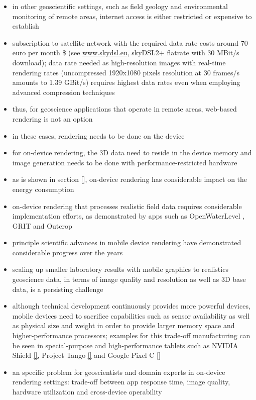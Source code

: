 \documentclass[review]{elsarticle}
\begin{document}
\begin{itemize}
\item in other geoscientific settings, such as field geology \cite{} and environmental monitoring \cite{} of remote areas, internet access is either restricted or expensive to establish
\item subscription to satellite network with the required data rate costs around 70 euro per month \$ (see \url{www.skydsl.eu}, skyDSL2+ flatrate with 30 MBit/s download); data rate needed as high-resolution images with real-time rendering rates (uncompressed 1920x1080 pixels resolution at 30 frames/s amounts to 1.39 GBit/s) requires highest data rates even when employing advanced compression techniques
\item thus, for geoscience applications that operate in remote areas, web-based rendering is not an option
\item in these cases, rendering needs to be done on the device
\item for on-device rendering, the 3D data need to reside in the device memory and image generation needs to be done with performance-restricted hardware
\item as is shown in section \ref{}, on-device rendering has considerable impact on the energy consumption
\item on-device rendering that processes realistic field data requires considerable implementation efforts, as demonstrated by apps such as OpenWaterLevel \cite{}, GRIT \cite{} and Outcrop \cite{}
\item principle scientific advances in mobile device rendering have demonstrated considerable progress over the years \cite{Garcia2015,Kehl2015a,Agus2017}
\item scaling up smaller laboratory results with mobile graphics to realistics geoscience data, in terms of image quality and resolution as well as 3D base data, is a persisting challenge
\item although technical development continuously provides more powerful devices, mobile devices need to sacrifice capabilities such as sensor availability as well as physical size and weight in order to provide larger memory space and higher-performance processors; examples for this trade-off manufacturing can be seen in special-purpose and high-performance tablets such as NVIDIA Shield \ref{}, Project Tango \ref{} and Google Pixel C \ref{}
\item an specific problem for geoscientists and domain experts in on-device rendering settings: trade-off between app response time, image quality, hardware utilization and cross-device operability

\end{itemize}
\end{document}
